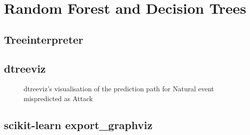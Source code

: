 \section{Random Forest and Decision Trees}
\subsection{Treeinterpreter}

\subsection{dtreeviz}


\begin{figure}[tb]
    \centering
    \caption{dtreeviz's visualisation of the prediction path for Natural event mispredicted as Attack}
    \label{fig:dtreeviz}
\end{figure}

\subsection{scikit-learn export\_graphviz}
